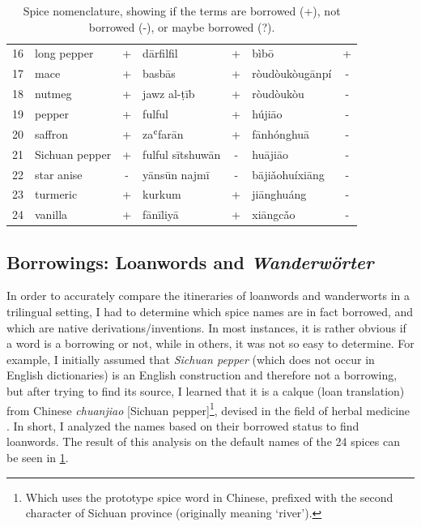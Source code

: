 \begin{table}[ht]
\begin{tabular}{@{}rlclclc@{}}
    16          & long pepper      & +           & dārfilfil        & +           & bìbō             & +           \\
    17          & mace             & +           & basbās           & +           & ròudòukòugānpí   & -           \\
    18          & nutmeg           & +           & jawz al-ṭīb      & +           & ròudòukòu        & -           \\
    19          & pepper           & +           & fulful           & +           & hújiāo           & -           \\
    20          & saffron          & +           & zaʿfarān         & +           & fānhónghuā       & -           \\
    21          & Sichuan pepper   & +           & fulful sītshuwān & -           & huā​jiāo         & -           \\
    22          & star anise       & -           & yānsūn najmī     & -           & bājiǎohuíxiāng   & -           \\
    23          & turmeric         & +           & kurkum           & +           & jiānghuáng       & -           \\
    24          & vanilla          & +           & fānīliyā         & +           & xiāngcǎo         & -           \\ \bottomrule
    \end{tabular}
    \caption[Spice nomenclature, showing if the terms are borrowed or not.]{Spice nomenclature, showing if the terms are borrowed (+), not borrowed (-), or maybe borrowed (?).}
    \label{table:borrowings}
    \end{table}



\subsection{Borrowings: Loanwords and \textit{Wanderwörter}}

In order to accurately compare the itineraries of loanwords and \glspl{wanderwort} in a trilingual setting, I had to determine which spice names are in fact borrowed, and which are native derivations/inventions. In most instances, it is rather obvious if a word is a borrowing or not, while in others, it was not so easy to determine. For example, I initially assumed that \textit{Sichuan pepper} (which does not occur in English dictionaries) is an English construction and therefore not a borrowing, but after trying to find its source, I learned that it is a calque (loan translation) from Chinese  \textit{chuanjiao} [Sichuan pepper]\footnote{Which uses the prototype spice word in Chinese, prefixed with the second character of Sichuan province (originally meaning `river').}, devised in the field of herbal medicine \autocite[140]{hooper_chinese_1929}. In short, I analyzed the names based on their borrowed status to find loanwords. The result of this analysis on the default names of the 24 spices can be seen in \cref{table:borrowings}.

